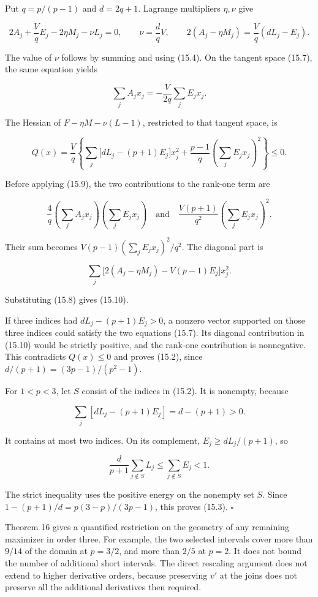 \documentclass[11pt]{article}
\begin{document}
Put \(q=p/(p-1)\) and \(d=2q+1\). Lagrange multipliers \(\eta,\nu\) give

\[
2A_j+\frac VqE_j-2\eta M_j-\nu L_j=0,
\qquad \nu=\frac dqV,
\qquad
2(A_j-\eta M_j)=\frac Vq(dL_j-E_j).
\tag{15.8}
\]

The value of \(\nu\) follows by summing and using (15.4). On the tangent
space (15.7), the same equation yields

\[
\sum_jA_jx_j=-\frac{V}{2q}\sum_jE_jx_j.
\tag{15.9}
\]

The Hessian of \(F-\eta M-\nu(L-1)\), restricted to that tangent space,
is

\[
Q(x)=\frac Vq\left\{
\sum_j\bigl[dL_j-(p+1)E_j\bigr]x_j^2
+\frac{p-1}{q}\left(\sum_jE_jx_j\right)^2
\right\}\le0.
\tag{15.10}
\]

Before applying (15.9), the two contributions to the rank-one term are

\[
\frac4q\left(\sum_j A_jx_j\right)\left(\sum_j E_jx_j\right)
\quad\text{and}\quad
\frac{V(p+1)}{q^2}\left(\sum_j E_jx_j\right)^2.
\]

Their sum becomes \(V(p-1)(\sum_jE_jx_j)^2/q^2\). The diagonal part is

\[
\sum_j\bigl[2(A_j-\eta M_j)-V(p-1)E_j\bigr]x_j^2.
\]

Substituting (15.8) gives (15.10).

If three indices had \(dL_j-(p+1)E_j>0\), a nonzero vector supported on
those three indices could satisfy the two equations (15.7). Its diagonal
contribution in (15.10) would be strictly positive, and the rank-one
contribution is nonnegative. This contradicts \(Q(x)\le0\) and proves
(15.2), since \(d/(p+1)=(3p-1)/(p^2-1)\).

For \(1<p<3\), let \(S\) consist of the indices in (15.2). It is
nonempty, because

\[
\sum_j[dL_j-(p+1)E_j]=d-(p+1)>0.
\tag{15.11}
\]

It contains at most two indices. On its complement,
\(E_j\ge dL_j/(p+1)\), so

\[
\frac{d}{p+1}\sum_{j\notin S}L_j
\le\sum_{j\notin S}E_j<1.
\tag{15.12}
\]

The strict inequality uses the positive energy on the nonempty set
\(S\). Since \(1-(p+1)/d=p(3-p)/(3p-1)\), this proves (15.3).
\(\square\)

Theorem 16 gives a quantified restriction on the geometry of any
remaining maximizer in order three. For example, the two selected
intervals cover more than \(9/14\) of the domain at \(p=3/2\), and more
than \(2/5\) at \(p=2\). It does not bound the number of additional
short intervals. The direct rescaling argument does not extend to higher
derivative orders, because preserving \(v'\) at the joins does not
preserve all the additional derivatives then required.
\end{document}
